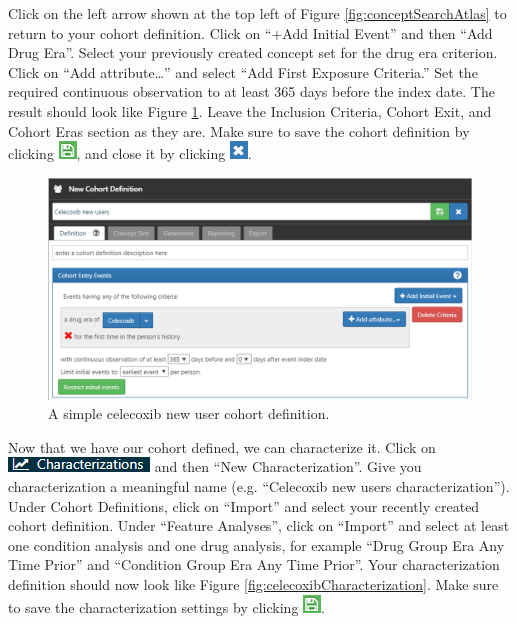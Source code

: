 \documentclass[11pt]{book}
\theoremstyle{definition}
\theoremstyle{definition}
\theoremstyle{definition}
\theoremstyle{remark}
\begin{document}
Click on the left arrow shown at the top left of Figure
\ref{fig:conceptSearchAtlas} to return to your cohort definition. Click
on ``+Add Initial Event'' and then ``Add Drug Era''. Select your
previously created concept set for the drug era criterion. Click on
``Add attribute\ldots{}'' and select ``Add First Exposure Criteria.''
Set the required continuous observation to at least 365 days before the
index date. The result should look like Figure
\ref{fig:celecoxibCohortDefinition}. Leave the Inclusion Criteria,
Cohort Exit, and Cohort Eras section as they are. Make sure to save the
cohort definition by clicking \includegraphics{images/Cohorts/save.png},
and close it by clicking
\includegraphics{images/SuggestedAnswers/close.png}.

\begin{figure}

{\centering \includegraphics[width=1\linewidth]{images/SuggestedAnswers/celecoxibCohortDefinition} 

}

\caption{A simple celecoxib new user cohort definition.}\label{fig:celecoxibCohortDefinition}
\end{figure}

Now that we have our cohort defined, we can characterize it. Click on
\includegraphics{images/Characterization/atlasCharacterizationMenuItem.png}
and then ``New Characterization''. Give you characterization a
meaningful name (e.g. ``Celecoxib new users characterization''). Under
Cohort Definitions, click on ``Import'' and select your recently created
cohort definition. Under ``Feature Analyses'', click on ``Import'' and
select at least one condition analysis and one drug analysis, for
example ``Drug Group Era Any Time Prior'' and ``Condition Group Era Any
Time Prior''. Your characterization definition should now look like
Figure \ref{fig:celecoxibCharacterization}. Make sure to save the
characterization settings by clicking
\includegraphics{images/Cohorts/save.png}.
\end{document}
